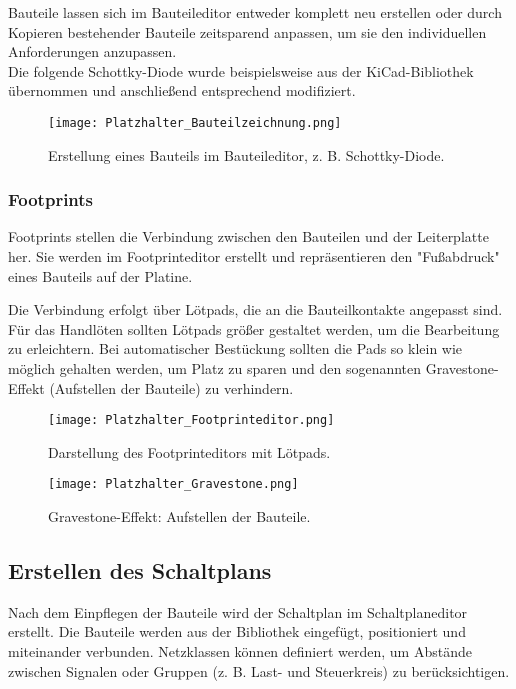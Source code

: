 \noindent
Bauteile lassen sich im Bauteileditor entweder komplett neu erstellen oder durch Kopieren bestehender Bauteile zeitsparend anpassen, um sie den individuellen Anforderungen anzupassen.\\
Die folgende Schottky-Diode wurde beispielsweise aus der KiCad-Bibliothek übernommen und anschließend entsprechend modifiziert.

\begin{figure}[h]  
    \centering  
    \texttt{[image: Platzhalter\_Bauteilzeichnung.png]}  
    \caption{Erstellung eines Bauteils im Bauteileditor, z. B. Schottky-Diode.} 
    \label{fig:Abbildung 7} 
\end{figure}  

\subsubsection{Footprints}  
Footprints stellen die Verbindung zwischen den Bauteilen und der Leiterplatte her. Sie werden im Footprinteditor erstellt und repräsentieren den "Fußabdruck" eines Bauteils auf der Platine.  

Die Verbindung erfolgt über Lötpads, die an die Bauteilkontakte angepasst sind. Für das Handlöten sollten Lötpads größer gestaltet werden, um die Bearbeitung zu erleichtern. Bei automatischer Bestückung sollten die Pads so klein wie möglich gehalten werden, um Platz zu sparen und den sogenannten Gravestone-Effekt (Aufstellen der Bauteile) zu verhindern.  

\begin{figure}[h]  
    \centering  
    \texttt{[image: Platzhalter\_Footprinteditor.png]}  
    \caption{Darstellung des Footprinteditors mit Lötpads.}
    \label{fig:Abbildung 8} 
\end{figure}  

\begin{figure}[h]  
    \centering  
    \texttt{[image: Platzhalter\_Gravestone.png]}  
    \caption{Gravestone-Effekt: Aufstellen der Bauteile.}
    \label{fig:Abbildung 9}  
\end{figure}  

\subsection{Erstellen des Schaltplans}  
Nach dem Einpflegen der Bauteile wird der Schaltplan im Schaltplaneditor erstellt. Die Bauteile werden aus der Bibliothek eingefügt, positioniert und miteinander verbunden. Netzklassen können definiert werden, um Abstände zwischen Signalen oder Gruppen (z. B. Last- und Steuerkreis) zu berücksichtigen.  

